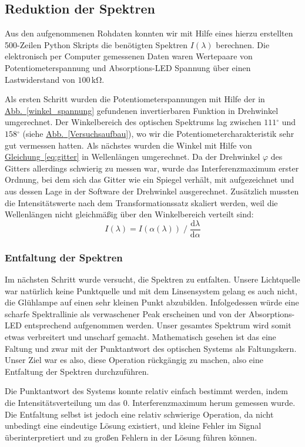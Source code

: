 \documentclass[11pt]{scrartcl}
\newcommand{\unit}[1]{\ensuremath{\,\mathrm{#1}}} %
\newcommand{\degr}{\ensuremath{^\circ}}
\newcommand{\dif}{\ensuremath{\mathrm{d}}}
\newcommand{\hypref}[2]{\hyperref[#2]{{#1}~\ref{#2}}}
\begin{document}
\subsection{Reduktion der Spektren}
Aus den aufgenommenen Rohdaten konnten wir mit Hilfe eines hierzu erstellten 500-Zeilen Python Skripts die benötigten Spektren $I(\lambda)$ berechnen.
Die elektronisch per Computer gemessenen Daten waren Wertepaare von Potentiometerspannung und Absorptions-LED Spannung über einen Lastwiderstand von $100\unit{k\Omega}$.

Als ersten Schritt wurden die Potentiometerspannungen mit Hilfe der in \hypref{Abb.}{winkel_spannung} gefundenen invertierbaren Funktion in Drehwinkel umgerechnet.
Der Winkelbereich des optischen Spektrums lag zwischen $111\degr$ und $158\degr$ (siehe \hypref{Abb.}{Versuchsaufbau}), wo wir die Potentiometercharakteristik sehr gut vermessen hatten.
Als nächstes wurden die Winkel mit Hilfe von \hypref{Gleichung}{eq:gitter} in Wellenlängen umgerechnet. Da der Drehwinkel $\varphi$ des Gitters allerdings schwierig zu messen war, wurde das Interferenzmaximum erster Ordnung, bei dem sich das Gitter wie ein Spiegel verhält, mit aufgezeichnet und aus dessen Lage in der Software der Drehwinkel ausgerechnet. Zusätzlich mussten die Intensitätswerte nach dem Transformationssatz skaliert werden, weil die Wellenlängen nicht gleichmäßig über den Winkelbereich verteilt sind:
\begin{equation}
I(\lambda) = I(\alpha(\lambda)) \;/\; \frac{\dif\lambda}{\dif\alpha}
\end{equation}

\subsubsection{Entfaltung der Spektren}
Im nächsten Schritt wurde versucht, die Spektren zu entfalten.
Unsere Lichtquelle war natürlich keine Punktquelle und mit dem Linsensystem gelang es auch nicht, die Glühlampe auf einen sehr kleinen Punkt abzubilden.
Infolgedessen würde eine scharfe Spektrallinie als verwaschener Peak erscheinen und von der Absorptions-LED entsprechend aufgenommen werden. Unser gesamtes Spektrum wird somit etwas verbreitert und unscharf gemacht.
Mathematisch gesehen ist das eine Faltung und zwar mit der Punktantwort des optischen Systems als Faltungskern.
Unser Ziel war es also, diese Operation rückgängig zu machen, also eine Entfaltung der Spektren durchzuführen.

Die Punktantwort des Systems konnte relativ einfach bestimmt werden, indem die Intensitätsverteilung um das 0. Interferenzmaximum herum gemessen wurde.
Die Entfaltung selbst ist jedoch eine relativ schwierige Operation, da nicht unbedingt eine eindeutige Lösung existiert, und kleine Fehler im Signal überinterpretiert und zu großen Fehlern in der Lösung führen können.
\end{document}
